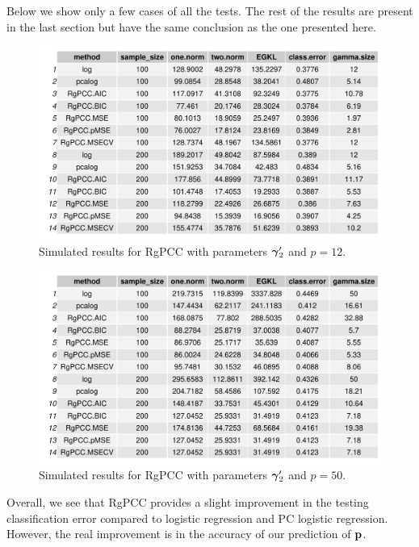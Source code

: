 \documentclass[main.tex]{subfiles}
\begin{document}
Below we show only a few cases of all the tests. The rest of the results are present in the last section but have the same conclusion as the one presented here.
\begin{figure}[H]
    \centering
    \includegraphics[width =  \textwidth]{simulated/(sparsity3-nonlead,12)_metrics.pdf}
    \caption{Simulated results for RgPCC with parameters $\boldsymbol \gamma_2'$ and $p = 12$.}
    \label{fig:simulated2-12}
\end{figure}

\begin{figure}[H]
	\centering
    \includegraphics[width =  \textwidth]{simulated/(sparsity3-nonlead,50)_metrics.pdf}
    \caption{Simulated results for RgPCC with parameters $\boldsymbol \gamma_2'$ and $p = 50$.}
    \label{fig:simulated2-50}
\end{figure}

Overall, we see that RgPCC provides a slight improvement in the testing classification error compared to logistic regression and PC logistic regression. However, the real improvement is in the accuracy of our prediction of $\mathbf{p}$.
\end{document}
